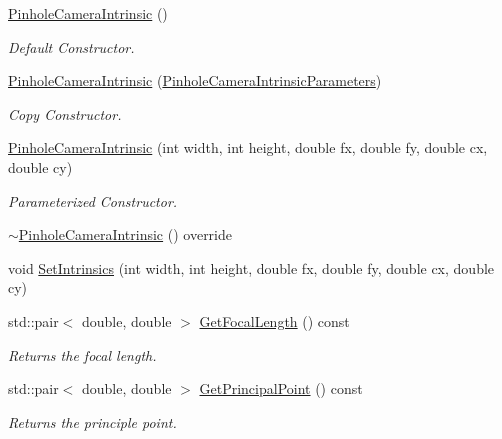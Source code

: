 \begin{DoxyCompactItemize}
\item 
\mbox{\hyperlink{classopen3d_1_1camera_1_1_pinhole_camera_intrinsic_a59768338fc10de4e43a8e120ab11c3f9}{Pinhole\+Camera\+Intrinsic}} ()
\begin{DoxyCompactList}\small\item\em Default Constructor. \end{DoxyCompactList}\item 
\mbox{\hyperlink{classopen3d_1_1camera_1_1_pinhole_camera_intrinsic_a66efe2d0836fecf418196753adec5676}{Pinhole\+Camera\+Intrinsic}} (\mbox{\hyperlink{namespaceopen3d_1_1camera_a57dc47ff7ac14e5f8be58be554497793}{Pinhole\+Camera\+Intrinsic\+Parameters}})
\begin{DoxyCompactList}\small\item\em Copy Constructor. \end{DoxyCompactList}\item 
\mbox{\hyperlink{classopen3d_1_1camera_1_1_pinhole_camera_intrinsic_a9b0c541b362f60d55702997c7ad85bf2}{Pinhole\+Camera\+Intrinsic}} (int width, int height, double fx, double fy, double cx, double cy)
\begin{DoxyCompactList}\small\item\em Parameterized Constructor. \end{DoxyCompactList}\item 
\mbox{\hyperlink{classopen3d_1_1camera_1_1_pinhole_camera_intrinsic_a2a960b4cd603659c2bc123d1d8b38a3a}{$\sim$\+Pinhole\+Camera\+Intrinsic}} () override
\item 
void \mbox{\hyperlink{classopen3d_1_1camera_1_1_pinhole_camera_intrinsic_ae56eaa41d3552618b0df332af2aac4cc}{Set\+Intrinsics}} (int width, int height, double fx, double fy, double cx, double cy)
\item 
std\+::pair$<$ double, double $>$ \mbox{\hyperlink{classopen3d_1_1camera_1_1_pinhole_camera_intrinsic_a2964f615d4d877b93287fe6abb3fa630}{Get\+Focal\+Length}} () const
\begin{DoxyCompactList}\small\item\em Returns the focal length. \end{DoxyCompactList}\item 
std\+::pair$<$ double, double $>$ \mbox{\hyperlink{classopen3d_1_1camera_1_1_pinhole_camera_intrinsic_a029da5bae0d1785f347583bc544f2ae8}{Get\+Principal\+Point}} () const
\begin{DoxyCompactList}\small\item\em Returns the principle point. \end{DoxyCompactList}\item 

\end{DoxyCompactItemize}
